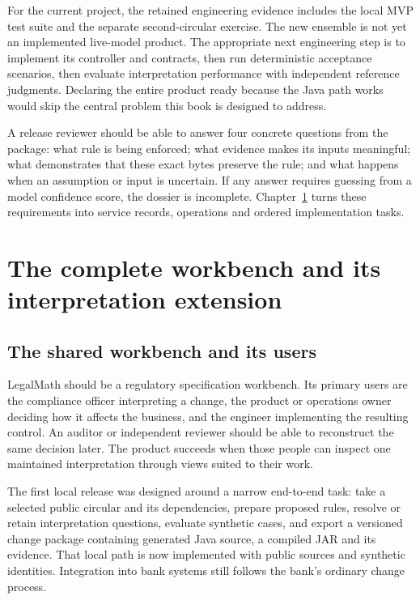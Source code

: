 \documentclass[12pt,a4paper,oneside,openany]{book}
\begin{document}
For the current project, the retained engineering evidence includes the local
MVP test suite and the separate second-circular exercise. The new ensemble is not
yet an implemented live-model product. The appropriate next engineering step is
to implement its controller and contracts, then run deterministic acceptance
scenarios, then evaluate interpretation performance with independent reference
judgments. Declaring the entire product ready because the Java path works would
skip the central problem this book is designed to address.

A release reviewer should be able to answer four concrete questions from the
package: what rule is being enforced; what evidence makes its inputs meaningful;
what demonstrates that these exact bytes preserve the rule; and what happens when
an assumption or input is uncertain. If any answer requires guessing from a model
confidence score, the dossier is incomplete. Chapter~\ref{ch:implementation} turns
these requirements into service records, operations and ordered implementation
tasks.


\chapter{The complete workbench and its interpretation extension}
\label{ch:implementation}

\section{The shared workbench and its users}
\label{merge:P-03-product:00}

\label{sec:product}

LegalMath should be a regulatory specification workbench. Its primary users are
the compliance officer interpreting a change, the product or operations owner
deciding how it affects the business, and the engineer implementing the resulting
control. An auditor or independent reviewer should be able to reconstruct the
same decision later. The product succeeds when those people can inspect one
maintained interpretation through views suited to their work.

The first local release was designed around a narrow end-to-end task: take a selected public
circular and its dependencies, prepare proposed rules, resolve or retain
interpretation questions, evaluate synthetic cases, and export a versioned change
package containing generated Java source, a compiled JAR and its evidence.
That local path is now implemented with public sources and synthetic
identities. Integration into bank systems still follows the bank's ordinary
change process.
\end{document}
